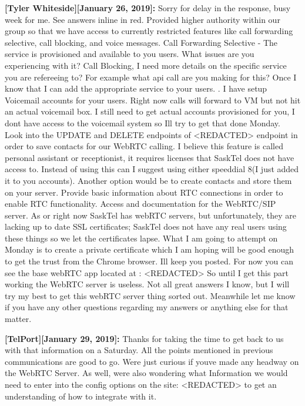 \documentclass[12pt]{article}
\begin{document}
\textbf{[Tyler Whiteside][January 26, 2019]:} Sorry for delay in the response, busy week for me. See answers inline in red. Provided higher authority within our group so that we have access to currently restricted features like call forwarding selective, call blocking, and voice messages. Call Forwarding Selective - The service is provisioned and available to you users.  What issues are you experiencing with it? Call Blocking,  I need more details on the specific service you are refereeing to?  For example what api call are you making for this? Once I know that I can add the appropriate service to your users.   .
I have setup Voicemail accounts for your users.  Right now calls will forward to VM but not hit an actual voicemail box. I still need to get actual accounts provisioned for you, I dont have access to the voicemail system so Ill try to get that done Monday. Look into the UPDATE and DELETE endpoints of <REDACTED> endpoint in order to save contacts for our WebRTC calling. I believe this feature is called personal assistant or receptionist, it requires licenses that SaskTel does not have access to.  Instead of using this can I suggest using either speeddial 8(I just added it to you accounts).  Another option would be to create contacts and store them on your server. Provide basic information about RTC connections in order to enable RTC functionality. Access and documentation for the WebRTC/SIP server. As or right now SaskTel has webRTC servers, but unfortunately, they are lacking up to date SSL certificates; SaskTel does not have any real users using these things so we let the certificates lapse.  What I am going to attempt on Monday is to create a private certificate which I am hoping will be good enough to get the trust from the Chrome browser.  Ill keep you posted.  For now you can see the base webRTC app located at : <REDACTED>
So until I get this part working the WebRTC server is useless. Not all great answers I know, but I will try my best to get this webRTC server thing sorted out. Meanwhile let me know if you have any other questions regarding my answers or anything else for that matter.

\textbf{[TelPort][January 29, 2019]:} Thanks for taking the time to get back to us with  that information on a Saturday. All the points mentioned in previous communications are good to go. Were just curious if youve made any headway on the WebRTC Server. As well, were also wondering what Information we would need to enter into the config options on the site: <REDACTED> to get an understanding of how to integrate with it.
\end{document}
